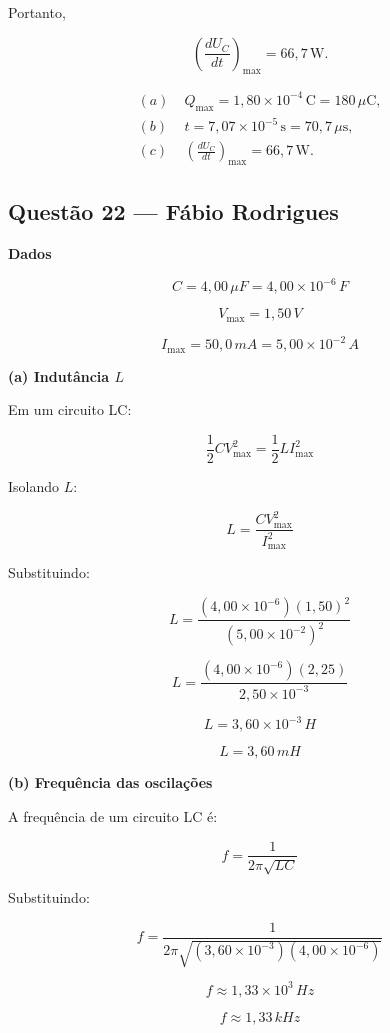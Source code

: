 \documentclass[12pt,a4paper]{article}
\begin{document}
           Portanto,

           \[
           \boxed{
           \left(\frac{dU_C}{dt}\right)_{\max}
           =
           66,7\,\mathrm{W}
           }.
           \]

           \[
           \boxed{
           \begin{aligned}
           (a)\;&Q_{\max}=1,80\times10^{-4}\,\mathrm{C}=180\,\mu\mathrm{C},\\[2mm]
           (b)\;&t=7,07\times10^{-5}\,\mathrm{s}=70,7\,\mu\mathrm{s},\\[2mm]
           (c)\;&\left(\frac{dU_C}{dt}\right)_{\max}=66,7\,\mathrm{W}.
           \end{aligned}
           }
           \]

\subsection{Questão 22 — Fábio Rodrigues}
\textbf{Dados}

\[
C = 4,00\,\mu F = 4,00 \times 10^{-6}\,F
\]

\[
V_{\max} = 1,50\,V
\]

\[
I_{\max} = 50,0\,mA = 5,00 \times 10^{-2}\,A
\]

\textbf{(a) Indutância \(L\)}

Em um circuito LC:

\[
\frac{1}{2}CV_{\max}^{2} = \frac{1}{2}LI_{\max}^{2}
\]

Isolando \(L\):

\[
L = \frac{CV_{\max}^{2}}{I_{\max}^{2}}
\]

Substituindo:

\[
L = \frac{(4,00 \times 10^{-6})(1,50)^2}{(5,00 \times 10^{-2})^2}
\]

\[
L = \frac{(4,00 \times 10^{-6})(2,25)}{2,50 \times 10^{-3}}
\]

\[
L = 3,60 \times 10^{-3}\,H
\]

\[
\boxed{L = 3,60\,mH}
\]

\textbf{(b) Frequência das oscilações}

A frequência de um circuito LC é:

\[
f = \frac{1}{2\pi\sqrt{LC}}
\]

Substituindo:

\[
f = \frac{1}{2\pi\sqrt{(3,60 \times 10^{-3})(4,00 \times 10^{-6})}}
\]

\[
f \approx 1,33 \times 10^{3}\,Hz
\]

\[
\boxed{f \approx 1,33\,kHz}
\]
\end{document}
